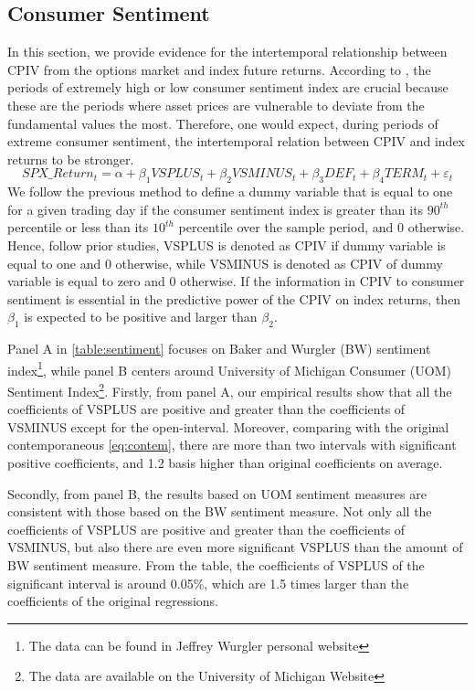 
\subsection{Consumer Sentiment}
In this section, we provide evidence for the intertemporal relationship between CPIV from the options market and index future returns. 
According to \textcite{atilgan2015implied}, the periods of extremely high or low consumer sentiment index are crucial because these are the periods where asset prices are vulnerable to deviate from the fundamental values the most. Therefore, one would expect, during periods of extreme consumer sentiment, the intertemporal relation between CPIV and index returns to be stronger.
 \begin{equation}  \label{eq:info}
SPX\_Return_{t} = \alpha + \beta _{1}VSPLUS_{t} + \beta _{2}VSMINUS_{t} + \beta _{3}DEF_{t} + \beta _{4}TERM_{t} + \varepsilon _{t}
 \end{equation}
We follow the previous method to define a dummy variable that is equal to one for a given trading day if the consumer sentiment index is greater than its $90^{th}$ percentile or less than its $10^{th}$ percentile over the sample period, and 0 otherwise. Hence, follow prior studies, VSPLUS is denoted as CPIV if dummy variable is equal to one and 0 otherwise, while VSMINUS is denoted as CPIV of dummy variable is equal to zero and 0 otherwise. If the information in CPIV to consumer sentiment is essential in the predictive power of the CPIV on index returns, then $\beta _{1}$ is expected to be positive and larger than $\beta _{2}$. 

Panel A in \autoref{table:sentiment} focuses on Baker and Wurgler (BW) sentiment index\footnote{The data can be found in Jeffrey Wurgler personal website}, while panel B centers around University of Michigan Consumer (UOM) Sentiment Index\footnote{The data are available on the University of Michigan Website}. Firstly, from panel A, our empirical results show that all the coefficients of VSPLUS are positive and greater than the coefficients of VSMINUS except for the open-interval. Moreover, comparing with the original contemporaneous \autoref{eq:contem}, there are more than two intervals with significant positive coefficients, and 1.2 basis higher than original coefficients on average. 

Secondly, from panel B, the results based on UOM sentiment measures are consistent with those based on the BW sentiment measure. Not only all the coefficients of VSPLUS are positive and greater than the coefficients of VSMINUS, but also there are even more significant VSPLUS than the amount of BW sentiment measure. From the table, the coefficients of VSPLUS of the significant interval is around 0.05\%, which are 1.5 times larger than the coefficients of the original regressions. 

